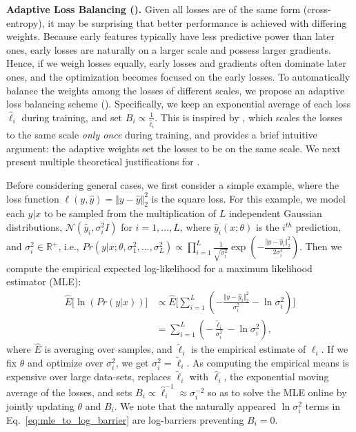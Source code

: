 \textbf{Adaptive Loss Balancing (\adaloss).} 
Given all losses are of the same form (cross-entropy), it may be surprising
that better performance is achieved with differing weights.
Because early features typically have less predictive power than later ones, early losses are naturally on a larger scale and possess larger gradients. Hence, if we weigh losses equally, early losses and gradients often dominate later ones, and the optimization becomes focused on the early losses.  
To automatically balance the weights among the losses of different scales, we propose an adaptive loss balancing scheme (\adaloss). Specifically, we keep an exponential average of each loss $\hat{\ell}_i$ during training, and set $B_i \propto  \frac{1}{\hat{\ell}_i}$. This is inspired by \cite{reverse_scene_seg}, which scales the losses to the same scale \emph{only once} during training, and provides a brief intuitive argument: the adaptive weights set the losses to be on the same scale. 
We next present multiple theoretical justifications for \adaloss.
 
Before considering general cases, we first consider a simple example, where the loss function $\ell(y, \hat{y}) = \Vert y - \hat{y}\Vert^2_2$ is the square loss. For this example, we model each $y|x$ to be sampled from the multiplication of $L$ independent Gaussian distributions, $\mathcal{N}(\hat{y}_i, \sigma_i^2 I)$ for $i=1,...,L$, where $\hat{y}_i(x; \theta)$ is the $i^{th}$ prediction, and $\sigma_i^2 \in \mathbb{R}^+$, i.e., 
$Pr(y|x ; \theta, \sigma_1^2,..., \sigma_L^2) \propto \prod _{i=1}^L  \frac{1}{\sqrt{\sigma_i^2}}\exp(-\frac{\Vert y - \hat{y}_i\Vert_2^2 }{2 \sigma_i^2})$. 
Then we compute the empirical expected log-likelihood for a maximum likelihood estimator (MLE):
\begin{align}
\hat{E}\big[\ln (Pr(y|x))\big]
&\propto  \hat{E} \big[\sum _{i=1}^L( -\frac{\Vert y - \hat{y}_i\Vert^2_2}{\sigma_i^2} -  \ln \sigma_i^2 ) \big] \\
&= \sum _{i=1}^L ( -\frac{\tilde{\ell}_i }{\sigma_i^2} -  \ln \sigma_i^2 ),
\label{eq:mle_to_log_barrier}
\end{align}
where $\hat{E}$ is averaging over samples, and $\tilde{\ell}_i$ is the empirical estimate of $\ell_i$. If we fix $\theta$ and optimize over $\sigma_i^2$, we get $\sigma_i^2 = \tilde{\ell}_i$.
As computing the empirical means is expensive over large data-sets, \adaloss replaces $\tilde{\ell}_i$ with $\hat{\ell}_i$, the exponential moving average of the losses, and sets $B_i \propto \hat{\ell}_i^{-1} \approx \sigma_i^{-2}$ so as to solve the MLE online by jointly updating $\theta$ and $B_i$. We note that the naturally appeared $\ln \sigma_i^2$ terms in Eq.~\ref{eq:mle_to_log_barrier} are log-barriers preventing $B_i=0$. 

